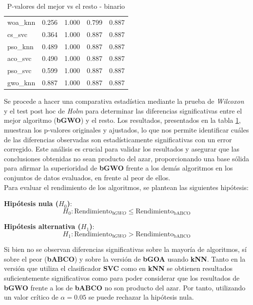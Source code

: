 \begin{table}[htb]
\begin{tabular}{lllll}
        woa\_knn   & 0.256     & 1.000          & 0.799          & 0.887          \\
        cs\_svc    & 0.364     & 1.000          & 0.887          & 0.887          \\
        pso\_knn   & 0.489     & 1.000          & 0.887          & 0.887          \\
        aco\_svc   & 0.490     & 1.000          & 0.887          & 0.887          \\
        pso\_svc   & 0.599     & 1.000          & 0.887          & 0.887          \\
        gwo\_knn   & 0.887     & 1.000          & 0.887          & 0.887          \\
        \bottomrule
    \end{tabular}
    \caption{P-valores del mejor vs el resto - binario}
    \label{tab:p-valus_gwo_vs_rest}
\end{table}

Se procede a hacer una comparativa estadística mediante la prueba de \textit{Wilcoxon} y el test post hoc de \textit{Holm} para determinar las diferencias significativas entre el mejor algoritmo (\textbf{bGWO}) y el resto. Los resultados, presentados en la tabla \ref{tab:p-valus_gwo_vs_rest}, muestran los p-valores originales y ajustados, lo que nos permite identificar cuáles de las diferencias observadas son estadísticamente significativas con un error corregido. Este análisis es crucial para validar los resultados y asegurar que las conclusiones obtenidas no sean producto del azar, proporcionando una base sólida para afirmar la superioridad de \textbf{bGWO} frente a los demás algoritmos en los conjuntos de datos evaluados, en frente al peor de ellos.\\[6pt]

Para evaluar el rendimiento de los algoritmos, se plantean las siguientes hipótesis:

\textbf{Hipótesis nula (\(H_0\))}:
\begin{equation}
    H_0: \text{Rendimiento}_{bGWO} \leq \text{Rendimiento}_{\text{bABCO}}
\end{equation}

\textbf{Hipótesis alternativa (\(H_1\))}:
\begin{equation}
    H_1: \text{Rendimiento}_{bGWO} > \text{Rendimiento}_{\text{bABCO}}
\end{equation}

Si bien no se observan diferencias significativas sobre la mayoría de algoritmos, sí sobre el peor (\textbf{bABCO}) y sobre la versión de \textbf{bGOA} usando \textbf{kNN}. Tanto en la versión que utiliza el clasificador \textbf{SVC} como en \textbf{kNN} se obtienen resultados suficientemente significativos como para poder considerar que los resultados de \textbf{bGWO} frente a los de \textbf{bABCO} no son producto del azar. Por tanto, utilizando un valor crítico de $\alpha=0.05$ se puede rechazar la hipótesis nula.


